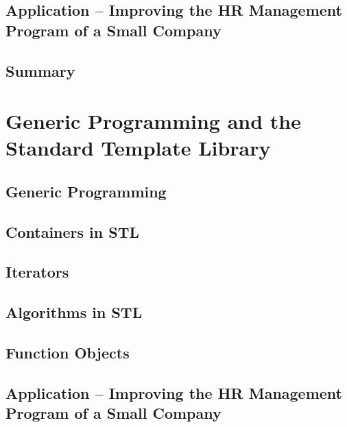 \documentclass[a4paper]{article}
\begin{document}
\subsection{Application – Improving the HR Management Program of a Small Company}

\subsection{Summary}


\newpage
\section{Generic Programming and the Standard Template Library}
\subsection{Generic Programming}

\subsection{Containers in STL}

\subsection{Iterators}

\subsection{Algorithms in STL}

\subsection{Function Objects}

\subsection{Application – Improving the HR Management Program of a Small Company}
\end{document}
